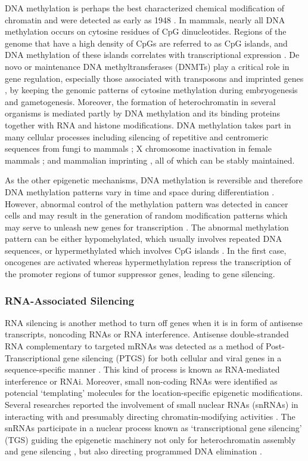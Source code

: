 DNA methylation is perhaps the best characterized chemical modification of chromatin and were detected as early as 1948 \cite{HOTCHKISS1948}. In mammals, nearly all DNA methylation occurs on cytosine residues of CpG dinucleotides. Regions of the genome that have a high density of CpGs are referred to as CpG islands, and DNA methylation of these islands correlates with transcriptional expression \cite{Deaton2011}. De novo or maintenance DNA methyltransferases (DNMTs) play a critical role in gene regulation, especially those associated with transposons and imprinted genes \cite{Goll2005}, by keeping the genomic patterns of cytosine methylation during embryogenesis and gametogenesis. Moreover, the formation of heterochromatin in several organisms is mediated partly by DNA methylation and its binding proteins together with RNA and histone modifications. DNA methylation takes part in many cellular processes including silencing of repetitive and centromeric sequences from fungi to mammals \cite{Partridge2002,Jones2012}; X chromosome inactivation in female mammals \cite{Weber2005}; and mammalian imprinting \cite{Bartolomei2011}, all of which can be stably maintained.

\medskip

As the other epigenetic mechanisms, DNA methylation is reversible and therefore DNA methylation patterns vary in time and space during differentiation \cite{Jones1980,Xie2013}. However, abnormal control of the methylation pattern was detected in cancer cells and may result in the generation of random modification patterns which may serve to unleash new genes for transcription \cite{Berdasco2010}. The abnormal methylation pattern can be either hypomehylated, which usually involves repeated DNA sequences, or hypermethylated which involves CpG islands \cite{Weber2005}. In the first case, oncogenes are activated whereas hypermethylation repress the transcription of the promoter regions of tumor suppressor genes, leading to gene silencing.

\subsubsection{RNA-Associated Silencing}

RNA silencing is another method to turn off genes when it is in form of antisense transcripts, noncoding RNAs or RNA interference. Antisense double-stranded RNA complementary to targeted mRNAs was detected as a method of Post-Transcriptional gene silencing (PTGS) for both cellular and viral genes in a sequence-specific manner \cite{Hamilton1999}. This kind of process is known as RNA-mediated interference or RNAi. Moreover, small non-coding RNAs were identified as potencial `templating' molecules for the location-specific epigenetic modifications. Several researches reported the involvement of small nuclear RNAs (snRNAs) in interacting with and presumably directing chromatin-modifying activities \cite{Mochizuki2002,Borges2015}. The snRNAs participate in a nuclear process known as `transcriptional gene silencing' (TGS) guiding the epigenetic machinery not only for heterochromatin assembly and gene silencing \cite{Grewal2003}, but also directing programmed DNA elimination \cite{Bernstein2005}.

